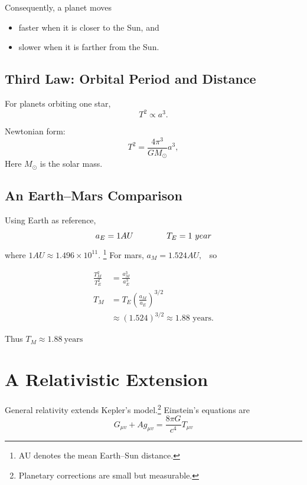 \documentclass{article}
\begin{document}
Consequently, a planet moves
\begin{itemize}
    \item[$\diamond$] faster when it is closer to the Sun, and
    \item[$\diamond$] slower when it is farther from the Sun.
\end{itemize}

\subsection{Third Law: Orbital Period and Distance}
For planets orbiting one star,
\begin{equation}
    T^2 \propto a^3.
\end{equation}

Newtonian form:
$$
    T^2 = \frac{4 \pi^3}{GM_{\odot}}a^3,
$$
Here $M_{\odot}$ is the solar mass.

\subsection{An Earth–Mars Comparison}
Using Earth as reference,
$$ a_E = 1 AU \hspace{40px} T_E = 1 \ year$$
where $1 AU \approx 1.496 \times 10^{11}.$ \footnote{AU denotes the mean Earth–Sun distance.} For mars, 
$a_M = 1.524 AU, $ \ so

\begin{equation*}
\begin{split}
\frac{T_M^2}{T_E^2} &= \frac{a_M^3}{a_E^3} \\
T_M &= T_E \left( \frac{a_M}{a_E} \right)^{3/2} \\
&\approx (1.524)^{3/2} \approx 1.88 \text{ years}.
\end{split}
\end{equation*}

Thus $T_M \approx 1.88 \ \text{years}$

\section{A Relativistic Extension}
General relativity extends Kepler’s model.\footnote{Planetary corrections are small but measurable.} Einstein’s equations are
\begin{equation}
    G_{\mu v} + Ag_{\mu v} = \frac{8 \pi G}{c^4} T_{\mu v}
\end{equation}
\end{document}
